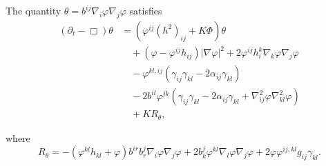 \documentclass{amsart}
\begin{document}
\begin{lemma}
\label{lem:Evtheta}
The quantity $\theta = b^{ij}\nabla_i \varphi\nabla_j\varphi$ satisfies
\[
\begin{split}
(\partial_{t} - \Box)\theta &= (\varphi^{ij}(h^2)_{ij} + K\Phi)\theta \\
&\quad + (\varphi - \varphi^{ij}h_{ij})|\nabla\varphi|^{2} + 2\varphi^{ij}h^{k}_{i}\nabla_k\varphi\nabla_j\varphi \\
&\quad - \varphi^{kl,ij} (\gamma_{ij}\gamma_{kl}  - 2\alpha_{ij} \gamma_{kl}) \\
&\quad - 2b^{il} \varphi^{jk} \left(\gamma_{ij} \gamma_{kl} - 2\alpha_{ij} \gamma_{kl} + \nabla^2_{ij}\varphi\nabla^2_{kl}\varphi\right) \\
&\quad + KR_{\theta},
\end{split}
\]
\end{lemma}
where
\[
R_{\theta} = -(\varphi^{kl}h_{kl} + \varphi)b^{ir}b^{j}_{r}\nabla_i \varphi\nabla_j\varphi + 2 b^{j}_{k}\varphi^{kl}\nabla_l\varphi\nabla_j\varphi + 2 \varphi\varphi^{ij,kl} g_{ij} \gamma_{kl}.
\]
\end{document}
